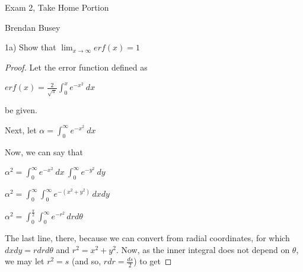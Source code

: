 \documentclass[12pt, executivepaper]{article}
\begin{document}
\vspace*{-40mm}

\begin{center}

Exam 2, Take Home Portion

\end{center}

\begin{flushright}

Brendan Busey

\end{flushright}

\begin{flushleft}

1a) Show that $\lim_{x\to\infty} erf(x)=1$

\begin{proof}

Let the error function defined as 

\begin{center}

$erf(x)=\frac{2}{\sqrt{\pi}} \int_{0}^{x} e^{-x^{2}} \ dx$

\end{center}

be given.

\vspace{2mm}

Next, let $\alpha=\int_{0}^{\infty} e^{-x^{2}} \ dx$

\vspace{2mm}

Now, we can say that

\begin{center}

$\alpha^2=\int_{0}^{\infty} e^{-x^{2}} \ dx \ \int_{0}^{\infty} e^{-y^{2}} \ dy$

\vspace{2mm}

$\alpha^2=\int_{0}^{\infty} \int_{0}^{\infty} e^{-(x^{2}+y^{2})} \, dxdy$

\vspace{2mm}

$\alpha^2=\int_{0}^{\frac{\pi}{2}} \int_{0}^{\infty} e^{-r^{2}} \, drd\theta$

\end{center}

The last line, there, because we can convert from radial coordinates, for which $dxdy=rdrd\theta$ and $r^2=x^2+y^2$. Now, as the inner integral does not depend on $\theta$, we may let $r^2=s$ (and so, $rdr=\frac{ds}{2}$) to get


\end{proof}
\end{flushleft}
\end{document}
